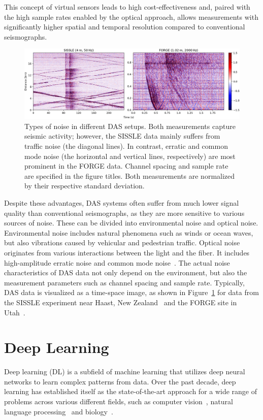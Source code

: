 This concept of virtual sensors leads to high cost-effectiveness and, paired with the high sample rates enabled by the optical approach, allows measurements with significantly higher spatial and temporal resolution compared to conventional seismographs.
\begin{figure}[b!]
    \includegraphics[width=\textwidth]{img/fig_2.2.png}
    \caption{
        Types of noise in different DAS setups.
        Both measurements capture seismic activity; however, the SISSLE data mainly suffers from traffic noise (the diagonal lines).
        In contrast, erratic and common mode noise (the horizontal and vertical lines, respectively) are most prominent in the FORGE data.
        Channel spacing and sample rate are specified in the figure titles.
        Both measurements are normalized by their respective standard deviation.
    }\label{fig:das-noise}
\end{figure}
Despite these advantages, DAS systems often suffer from much lower signal quality than conventional seismographs, as they are more sensitive to various sources of noise.
These can be divided into environmental noise and optical noise.
Environmental noise includes natural phenomena such as winds or ocean waves, but also vibrations caused by vehicular and pedestrian traffic.
Optical noise originates from various interactions between the light and the fiber.
It includes high-amplitude erratic noise and common mode noise~\cite{IDF}.
The actual noise characteristics of DAS data not only depend on the environment, but also the measurement parameters such as channel spacing and sample rate.
Typically, DAS data is visualized as a time-space image, as shown in Figure~\ref{fig:das-noise} for data from the SISSLE experiment near Haast, New Zealand~\cite{SISSLE} and the FORGE site in Utah~\cite{FORGE}.

\section{Deep Learning}

Deep learning (DL) is a subfield of machine learning that utilizes deep neural networks to learn complex patterns from data. 
Over the past decade, deep learning has established itself as the state-of-the-art approach for a wide range of problems across various different fields, such as computer vision~\cite{AlexNet}, natural language processing~\cite{GPT3} and biology~\cite{AlphaFold}.


